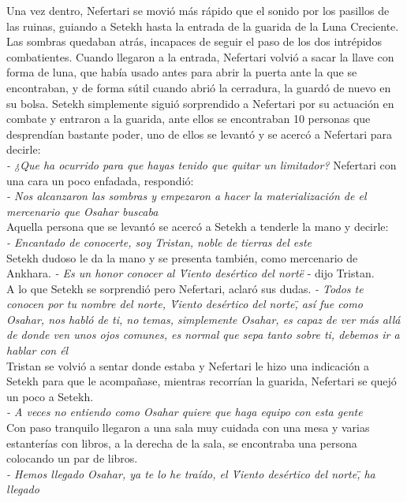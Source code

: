 Una vez dentro, Nefertari se movió más rápido que el sonido por los pasillos de las ruinas, guiando a Setekh hasta la entrada de la guarida de la Luna Creciente. Las sombras quedaban atrás, incapaces de seguir el paso de los dos intrépidos combatientes. Cuando llegaron a la entrada,
Nefertari volvió a sacar la llave con forma de luna, que había usado antes para abrir la puerta ante la que se encontraban, y de forma sútil cuando abrió la cerradura, la guardó de nuevo en su bolsa. Setekh simplemente siguió sorprendido a Nefertari por su actuación en combate y entraron a la guarida, ante ellos se encontraban 10 personas que desprendían bastante poder, uno de ellos se levantó y se acercó a Nefertari para decirle:\\
\textit{- ¿Que ha ocurrido para que hayas tenido que quitar un limitador?}
Nefertari con una cara un poco enfadada, respondió:\\
\textit{- Nos alcanzaron las sombras y empezaron a hacer la materialización de el mercenario que Osahar buscaba}\\
Aquella persona que se levantó se acercó a Setekh a tenderle la mano y decirle:\\
\textit{- Encantado de conocerte, soy Tristan, noble de tierras del este}\\
Setekh dudoso le da la mano y se presenta también, como mercenario de Ankhara.
\textit{- Es un honor conocer al \"Viento desértico del norte\"} - dijo Tristan.\\
A lo que Setekh se sorprendió pero Nefertari, aclaró sus dudas.
\textit{- Todos te conocen por tu nombre del norte, \"Viento desértico del norte\", así fue como Osahar, nos habló de ti, no temas, simplemente Osahar, es capaz de ver más allá de donde ven unos ojos comunes, es normal que sepa tanto sobre ti, debemos ir a hablar con él}\\
Tristan se volvió a sentar donde estaba y Nefertari le hizo una indicación a Setekh para que le acompañase, mientras recorrían la guarida, Nefertari se quejó un poco a Setekh.\\
\textit{- A veces no entiendo como Osahar quiere que haga equipo con esta gente}\\
Con paso tranquilo llegaron a una sala muy cuidada con una mesa y varias estanterías con libros, a la derecha de la sala, se encontraba una persona colocando un par de libros.\\
\textit{- Hemos llegado Osahar, ya te lo he traído, el \"Viento desértico del norte\", ha llegado}\\
